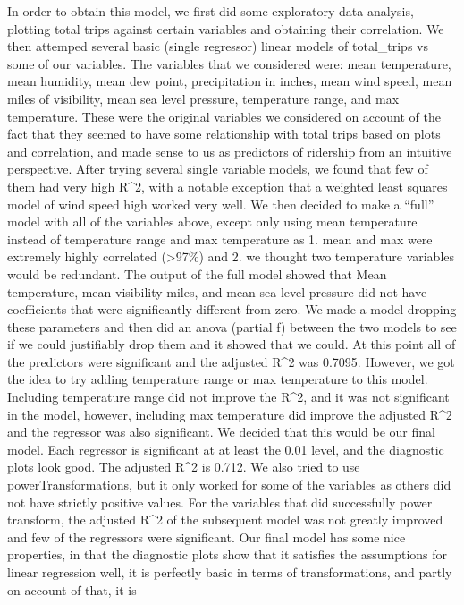 \documentclass[
]{article}
\begin{document}
In order to obtain this model, we first did some exploratory data
analysis, plotting total trips against certain variables and obtaining
their correlation. We then attemped several basic (single regressor)
linear models of total\_trips vs some of our variables. The variables
that we considered were: mean temperature, mean humidity, mean dew
point, precipitation in inches, mean wind speed, mean miles of
visibility, mean sea level pressure, temperature range, and max
temperature. These were the original variables we considered on account
of the fact that they seemed to have some relationship with total trips
based on plots and correlation, and made sense to us as predictors of
ridership from an intuitive perspective. After trying several single
variable models, we found that few of them had very high R\^{}2, with a
notable exception that a weighted least squares model of wind speed high
worked very well. We then decided to make a ``full'' model with all of
the variables above, except only using mean temperature instead of
temperature range and max temperature as 1. mean and max were extremely
highly correlated (\textgreater97\%) and 2. we thought two temperature
variables would be redundant. The output of the full model showed that
Mean temperature, mean visibility miles, and mean sea level pressure did
not have coefficients that were significantly different from zero. We
made a model dropping these parameters and then did an anova (partial f)
between the two models to see if we could justifiably drop them and it
showed that we could. At this point all of the predictors were
significant and the adjusted R\^{}2 was 0.7095. However, we got the idea
to try adding temperature range or max temperature to this model.
Including temperature range did not improve the R\^{}2, and it was not
significant in the model, however, including max temperature did improve
the adjusted R\^{}2 and the regressor was also significant. We decided
that this would be our final model. Each regressor is significant at at
least the 0.01 level, and the diagnostic plots look good. The adjusted
R\^{}2 is 0.712. We also tried to use powerTransformations, but it only
worked for some of the variables as others did not have strictly
positive values. For the variables that did successfully power
transform, the adjusted R\^{}2 of the subsequent model was not greatly
improved and few of the regressors were significant. Our final model has
some nice properties, in that the diagnostic plots show that it
satisfies the assumptions for linear regression well, it is perfectly
basic in terms of transformations, and partly on account of that, it is
\end{document}
